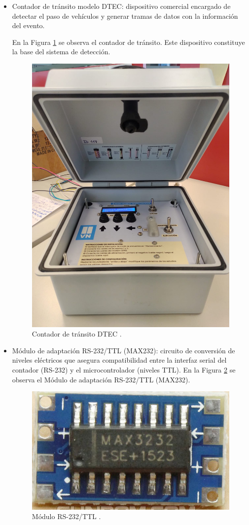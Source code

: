 \begin{itemize}
    \item Contador de tránsito modelo DTEC: dispositivo comercial encargado de detectar el paso de vehículos y generar tramas de datos con la información del evento.
   
En la Figura \ref{fig:foto_dtec2} se observa el contador de tránsito. Este dispositivo constituye la base del sistema de detección. 

\begin{figure}[htbp]
  \centering
  \includegraphics[width=0.5\linewidth]{./Figures/fotoDTEC2.jpeg}
  \caption{Contador de tránsito DTEC \protect\footnotemark.}
  \label{fig:foto_dtec2}
\end{figure}

 
    \item Módulo de adaptación RS-232/TTL (MAX232): circuito de conversión de niveles eléctricos que asegura compatibilidad entre la interfaz serial del contador (RS-232) y el microcontrolador (niveles TTL).
  En la Figura \ref{fig:foto_max232} se observa el Módulo de adaptación RS-232/TTL (MAX232).


\begin{figure}[htbp]
  \centering
  \includegraphics[width=0.4\linewidth]{./Figures/fotoMax232.png}
  \caption{Módulo RS-232/TTL \protect\footnotemark.}
  \label{fig:foto_max232}
\end{figure}


\end{itemize}
